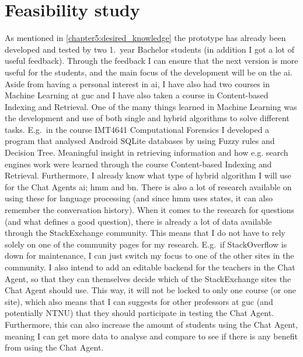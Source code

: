 \chapter{Feasibility study}
\label{chapter6:feasibility_study}
As mentioned in \ref{chapter5:desired_knowledge} the prototype has already been developed and tested by two 1.~year Bachelor students (in addition I got a lot of useful feedback). 
Through the feedback I can ensure that the next version is more useful for the students, and the main focus of the development will be on the \gls{ai}. Aside from 
having a personal interest in \gls{ai}, I have also had two courses in Machine Learning at \gls{guc} and I have also taken a course in Content-based Indexing and Retrieval. 
One of the many things learned in Machine Learning was the development and use of both single and hybrid algorithms to solve different tasks. E.g.~in the course IMT4641 
Computational Forensics I developed a program that analysed Android SQLite databases by using Fuzzy rules and Decision Tree. Meaningful insight in retrieving information 
and how e.g. search engines work were learned through the course Content-based Indexing and Retrieval. Furthermore, I already know what type of hybrid algorithm I will use 
for the Chat Agents \gls{ai}; \gls{hmm} and \gls{bn}. There is also a lot of research available on using these for language processing (and since \gls{hmm} uses states, it 
can also remember the conversation history).
\vspace{0.5em}\newline
When it comes to the research for questions (and what defines a good question), there is already a lot of data available through the StackExchange community. This means that 
I do not have to rely solely on one of the community pages for my research. E.g.~if StackOverflow is down for maintenance, I can just switch my focus to one of the other 
sites in the community. I also intend to add an editable backend for the teachers in the Chat Agent, so that they can themselves decide which of the StackExchange sites the 
Chat Agent should use. This way, it will not be locked to only one course (or one site), which also means that I can suggests for other professors at \gls{guc} (and potentially 
NTNU) that they should participate in testing the Chat Agent. Furthermore, this can also increase the amount of students using the Chat Agent, meaning I can get more data to 
analyse and compare to see if there is any benefit from using the Chat Agent.

